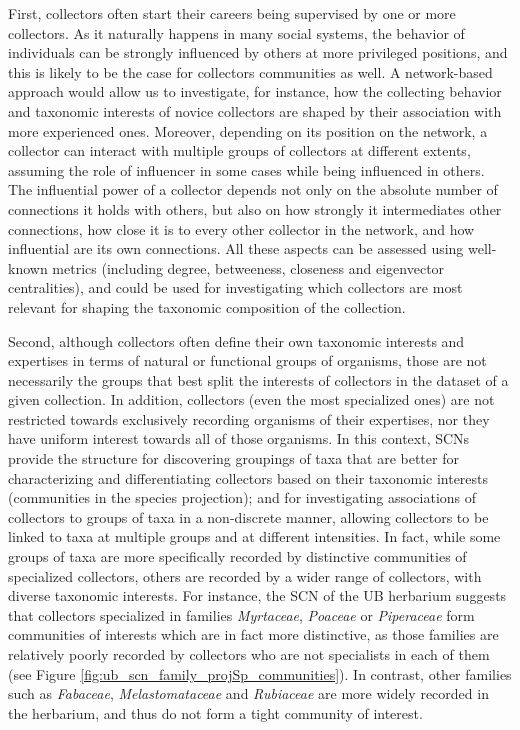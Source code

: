 First, collectors often start their careers being supervised by one or more collectors.
As it naturally happens in many social systems, the behavior of individuals can be strongly influenced by others at more privileged positions, and this is likely to be the case for collectors communities as well.
A network-based approach would allow us to investigate, for instance, how the collecting behavior and taxonomic interests of novice collectors are shaped by their association with more experienced ones.
Moreover, depending on its position on the network, a collector can interact with multiple groups of collectors at different extents, assuming the role of influencer in some cases while being influenced in others.
The influential power of a collector depends not only on the absolute number of connections it holds with others, but also on how strongly it intermediates other connections, how close it is to every other collector in the network, and how influential are its own connections. %
All these aspects can be assessed using well-known metrics (including degree, betweeness, closeness and eigenvector centralities), and could be used for investigating which collectors are most relevant for shaping the taxonomic composition of the collection. 

Second, although collectors often define their own taxonomic interests and expertises in terms of natural or functional groups of organisms, those are not necessarily the groups that best split the interests of collectors in the dataset of a given collection.
In addition, collectors (even the most specialized ones) are not restricted towards exclusively recording organisms of their expertises, nor they have uniform interest towards all of those organisms.
%
In this context, SCNs provide the structure for discovering groupings of taxa that are better for characterizing and differentiating collectors based on their taxonomic interests (communities in the species projection); and for investigating associations of collectors to groups of taxa in a non-discrete manner, allowing collectors to be linked to taxa at multiple groups and at different intensities.
%
In fact, while some groups of taxa are more specifically recorded by distinctive communities of specialized collectors, others are recorded by a wider range of collectors, with diverse taxonomic interests.
For instance, the SCN of the UB herbarium suggests that collectors specialized in families \textit{Myrtaceae}, \textit{Poaceae} or \textit{Piperaceae} form communities of interests which are in fact more distinctive, as those families are relatively poorly recorded by collectors who are not specialists in each of them (see Figure \ref{fig:ub_scn_family_projSp_communities}).
In contrast, other families such as \textit{Fabaceae}, \textit{Melastomataceae} and \textit{Rubiaceae} are more widely recorded in the herbarium, and thus do not form a tight community of interest.


